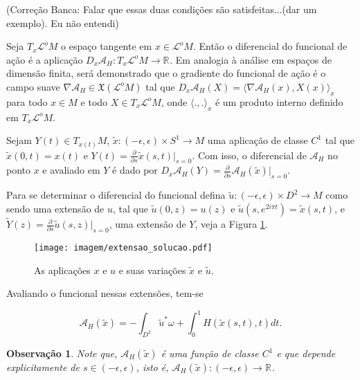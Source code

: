\documentclass[12pt]{book}
\newtheorem{observacao}[teorema]{Observação}
\newcommand{\campossuaves}[1]{\mathfrak{X}(#1)}
\newcommand{\derivadaparcial}[2]{\frac{\partial #1}{\partial #2}}
\newcommand{\espacotangenteponto}[2]{T_{#1}#2}
\newcommand{\funcionalH}{\mathcal{A}_{H}}
\newcommand{\funcionalHponto}[1]{\mathcal{A}_{H}(#1)}
\newcommand{\gradientefuncional}{\nabla \funcionalH}
\newcommand{\produtointerno}[2]{\langle #1, #2 \rangle}
\newcommand{\real}[1]{\mathbb{R}^{#1}}
\newcommand{\reta}{\real{}}
\newcommand{\lacocontrateis}{\mathcal{L}^{o}M}
\newcommand{\alerta}[1]{{\color{red}#1}}
\newcommand{\correcaobanca}[1]{\alerta{(Correção Banca: #1)}}
\begin{document}
	\correcaobanca{Falar que essas duas condições são satisfeitas...(dar um exemplo). Eu não entendi}
	
	Seja $\espacotangenteponto{x}{\lacocontrateis}$ o espaço tangente em $x \in \lacocontrateis$. Então o diferencial do funcional de ação é a aplicação $D_{x}\funcionalH: \espacotangenteponto{x}{\lacocontrateis }\to \real{}$. Em analogia à análise em espaços de dimensão finita, será demonstrado que o gradiente do funcional de ação é o campo suave $\gradientefuncional\in \campossuaves{\lacocontrateis}$ tal que $D_{x}\funcionalH(X) = \produtointerno{\gradientefuncional(x)}{X(x)}_{x}$ para todo $x\in M$ e todo $X\in \espacotangenteponto{x}{\lacocontrateis}$, onde $\produtointerno{.}{.}_{x}$ é um produto interno definido em $\espacotangenteponto{x}{\lacocontrateis}$.
	
	Sejam $Y(t) \in \espacotangenteponto{x(t)}{M}$, $\tilde{x}:(-\epsilon, \epsilon)\times S^{1} \to M$  uma aplicação de classe $C^{1}$ tal que $\tilde{x}(0,t) = x(t)$ e $Y(t) = \derivadaparcial{}{s}\tilde{x}(s,t)|_{s=0}$. Com isso, o diferencial de $\funcionalH$ no ponto $x$ e avaliado em $Y$ é dado por $D_{x}\funcionalH(Y) = \derivadaparcial{}{s}\funcionalH(\tilde{x})|_{s=0}$.
	
	Para se determinar o diferencial do funcional defina $\tilde{u}:(-\epsilon, \epsilon)\times D^{2} \to M$ como sendo uma extensão de $u$, tal que $\tilde{u}(0,z) = u(z)$ e $\tilde{u}(s,e^{2i\pi t}) = \tilde{x}(s,t)$, e $\tilde{Y}(z) = \derivadaparcial{}{s}\tilde{u}(s,z)|_{s=0}$, uma extensão de $Y$, veja a Figura \ref{figura_extensao_solucao}. 
	\begin{figure}[!h]
		\centering
		\texttt{[image: imagem/extensao\_solucao.pdf]}
		\caption{As aplicações $x$ e $u$ e suas variações $\tilde{x}$ e $\tilde{u}$.}
		\label{figura_extensao_solucao}
	\end{figure}
	
	Avaliando o funcional nessas extensões, tem-se
	
	$$
	\funcionalHponto{\tilde{x}} = -\int_{D^{2}}\tilde{u}^{*}\omega + \int_{0}^{1}H(\tilde{x}(s,t),t)dt.
	$$
	
	\begin{observacao}
		Note que, $	\funcionalHponto{\tilde{x}}$ é uma função de classe $C^{1}$ e que depende explicitamente de $s\in (-\epsilon, \epsilon)$, isto é, $	\funcionalHponto{\tilde{x}}:(-\epsilon,\epsilon)\to \reta$. 
	\end{observacao}
	
\end{document}
